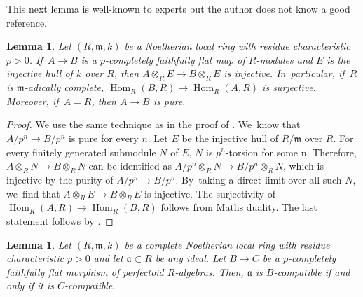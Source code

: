 \documentclass[JEP,XML,SOM,Unicode,published]{cedram}
\theoremstyle{plain}
\newtheorem{lemma}[theorem]{Lemma}
\theoremstyle{definition}
\numberwithin{equation}{theorem}
\let\tensor\otimes
\newcommand{\fra}{\mathfrak{a}}
\newcommand{\fram}{\mathfrak{m}}
\DeclareMathOperator{\Hom}{Hom}
\begin{document}
\noindent This next lemma is well-known to experts but the author does not know a good reference.

\begin{lemma}\label{pcomp fflat implies pure}
Let $(R,\fram,k)$ be a Noetherian local ring with residue characteristic $p>0$. If~$A\to B$ is a $p$-completely faithfully flat map of $R$\nobreakdash-modules and $E$ is the injective hull of $k$ over $R$, then $A\tensor_R E\to B\tensor_R E$ is injective. In~particular, if~$R$ is $\fram$-adically complete, $\Hom_R(B,R)\to \Hom_R(A,R)$ is surjective. Moreover, if~$A=R$, then $A\to B$ is pure.
\end{lemma}

\begin{proof}
We use the same technique as in the proof of \cite[Lem.\,4.5]{BMPSTWWPerfectoidPure}. We~know that $A/p^n\to B/p^n$ is pure for every $n$. Let $E$ be the injective hull of $R/\fram$ over $R$. For every finitely generated submodule $N$ of $E$, $N$ is $p^n$-torsion for some n. Therefore, $A\tensor_R N \to B\tensor_R N$ can be identified as $A/p^n\tensor_R N \to B/p^n \tensor_R N$, which is injective by the purity of $A/p^n\to B/p^n$. By~taking a direct limit over all such $N$, we~find that $A\tensor_R E \to B\tensor_R E$ is injective. The surjectivity of $\Hom_R(A,R)\to \Hom_R(B,R)$ follows from Matlis duality.
The last statement follows by \cite[Prop.\,6.11]{HochsterRobertsRingsOfInvariants}.
\end{proof}

\begin{lemma}\label{compatible iff pcomp fflat comp}
Let $(R,\fram,k)$ be a complete Noetherian local ring with residue characteristic $p>0$ and let $\fra\subset R$ be any ideal.
Let $B\to C$ be a $p$-completely faithfully flat morphism of perfectoid $R$\nobreakdash-algebras. Then, $\fra$ is $B$-compatible if and only if it is $C$-compatible.
\end{lemma}
\end{document}
